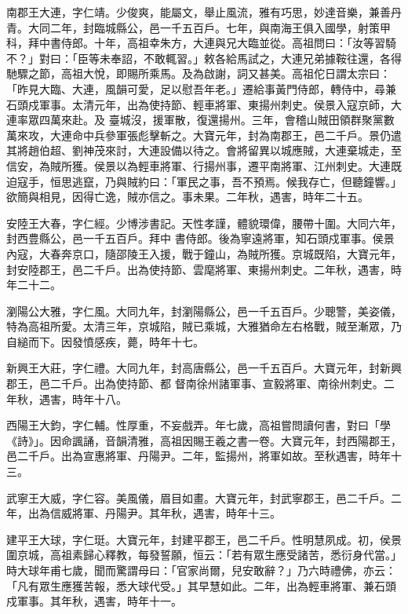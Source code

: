\begin{pinyinscope}
 南郡王大連，字仁靖。少俊爽，能屬文，舉止風流，雅有巧思，妙達音樂，兼善丹青。大同二年，封臨城縣公，邑一千五百戶。七年，與南海王俱入國學，射策甲科，拜中書侍郎。十年，高祖幸朱方，大連與兄大臨並從。高祖問曰：「汝等習騎不？」對曰：「臣等未奉詔，不敢輒習。」敕各給馬試之，大連兄弟據鞍往還，各得馳驟之節，高祖大悅，即賜所乘馬。及為啟謝，詞又甚美。高祖佗日謂太宗曰：「昨見大臨、大連，風韻可愛，足以慰吾年老。」遷給事黃門侍郎，轉侍中，尋兼石頭戍軍事。太清元年，出為使持節、輕車將軍、東揚州刺史。侯景入寇京師，大連率眾四萬來赴。及
 臺城沒，援軍散，復還揚州。三年，會稽山賊田領群聚黨數萬來攻，大連命中兵參軍張彪擊斬之。大寶元年，封為南郡王，邑二千戶。景仍遣其將趙伯超、劉神茂來討，大連設備以待之。會將留異以城應賊，大連棄城走，至信安，為賊所獲。侯景以為輕車將軍、行揚州事，遷平南將軍、江州刺史。大連既迫寇手，恒思逃竄，乃與賊約曰：「軍民之事，吾不預焉。候我存亡，但聽鐘響。」欲簡與相見，因得亡逸，賊亦信之。事未果。二年秋，遇害，時年二十五。



 安陸王大春，字仁經。少博涉書記。天性孝謹，體貌環偉，腰帶十圍。大同六年，封西豊縣公，邑一千五百戶。拜中
 書侍郎。後為寧遠將軍，知石頭戍軍事。侯景內寇，大春奔京口，隨邵陵王入援，戰于鐘山，為賊所獲。京城既陷，大寶元年，封安陸郡王，邑二千戶。出為使持節、雲麾將軍、東揚州刺史。二年秋，遇害，時年二十二。



 瀏陽公大雅，字仁風。大同九年，封瀏陽縣公，邑一千五百戶。少聰警，美姿儀，特為高祖所愛。太清三年，京城陷，賊已乘城，大雅猶命左右格戰，賊至漸眾，乃自縋而下。因發憤感疾，薨，時年十七。



 新興王大莊，字仁禮。大同九年，封高唐縣公，邑一千五百戶。大寶元年，封新興郡王，邑二千戶。出為使持節、都
 督南徐州諸軍事、宣毅將軍、南徐州刺史。二年秋，遇害，時年十八。



 西陽王大鈞，字仁輔。性厚重，不妄戲弄。年七歲，高祖嘗問讀何書，對曰「學《詩》」。因命諷誦，音韻清雅，高祖因賜王羲之書一卷。大寶元年，封西陽郡王，邑二千戶。出為宣惠將軍、丹陽尹。二年，監揚州，將軍如故。至秋遇害，時年十三。



 武寧王大威，字仁容。美風儀，眉目如畫。大寶元年，封武寧郡王，邑二千戶。二年，出為信威將軍、丹陽尹。其年秋，遇害，時年十三。



 建平王大球，字仁珽。大寶元年，封建平郡王，邑二千戶。性明慧夙成。初，侯景圍京城，高祖素歸心釋教，每發誓願，恒云：「若有眾生應受諸苦，悉衍身代當。」時大球年甫七歲，聞而驚謂母曰：「官家尚爾，兒安敢辭？」乃六時禮佛，亦云：「凡有眾生應獲苦報，悉大球代受。」其早慧如此。二年，出為輕車將軍、兼石頭戍軍事。其年秋，遇害，時年十一。




\end{pinyinscope}
